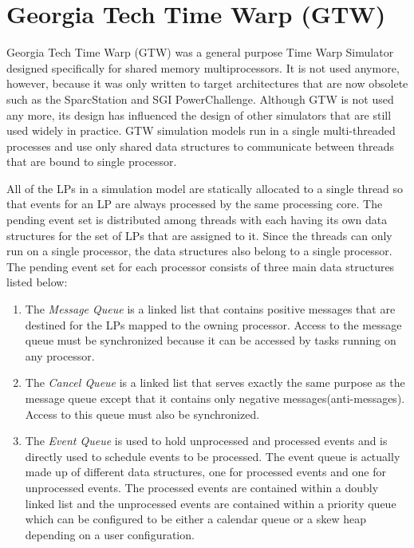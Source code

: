 \documentclass[11pt]{book}
\begin{document}
\section{Georgia Tech Time Warp (GTW)}

Georgia Tech Time Warp \cite{das-94} (GTW) was a general purpose Time Warp Simulator designed
specifically for shared memory multiprocessors.  It is not used anymore, however, because it was
only written to target architectures that are now obsolete such as the SparcStation and SGI
PowerChallenge.  Although GTW is not used any more, its design has influenced the design of other
simulators that are still used widely in practice.  GTW simulation models run in a single
multi-threaded processes and use only shared data structures to communicate between threads that are
bound to single processor.

All of the LPs in a simulation model are statically allocated to a single thread so that events for
an LP are always processed by the same processing core.  The pending event set is distributed among
threads with each having its own data structures for the set of LPs that are assigned to it.  Since
the threads can only run on a single processor, the data structures also belong to a single
processor.  The pending event set for each processor consists of three main data structures listed
below\cite{das-94}:

\begin{enumerate}
\item The \emph{Message Queue} is a linked list that contains positive messages that are destined
  for the LPs mapped to the owning processor.  Access to the message queue must be synchronized
  because it can be accessed by tasks running on any processor.
\item The \emph{Cancel Queue} is a linked list that serves exactly the same purpose as the message
  queue except that it contains only negative messages(anti-messages).  Access to this queue must
  also be synchronized.
\item The \emph{Event Queue} is used to hold unprocessed and processed events and is directly used
  to schedule events to be processed.  The event queue is actually made up of different data
  structures, one for processed events and one for unprocessed events.  The processed events are
  contained within a doubly linked list and the unprocessed events are contained within a priority
  queue which can be configured to be either a calendar queue or a skew heap depending on a user
  configuration.
\end{enumerate}
\end{document}
